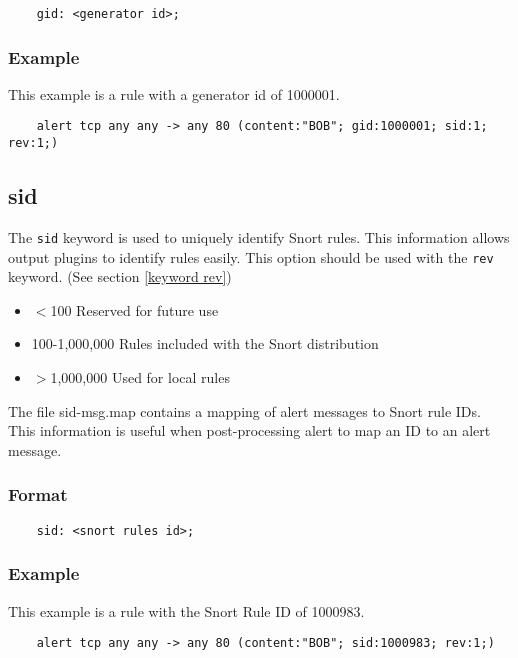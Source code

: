 \documentclass[english]{report}
\begin{document}
\begin{verbatim}
    gid: <generator id>;
\end{verbatim}

\subsubsection{Example}

This example is a rule with a generator id of 1000001. 

\begin{verbatim}
    alert tcp any any -> any 80 (content:"BOB"; gid:1000001; sid:1; rev:1;)
\end{verbatim}

\subsection{sid}
\label{keyword sid}

The \texttt{sid} keyword is used to uniquely identify Snort rules. This
information allows output plugins to identify rules easily.  This option should
be used with the \texttt{rev} keyword.  (See section \ref{keyword rev})

\begin{itemize}
\item $<$100 Reserved for future use
\item 100-1,000,000 Rules included with the Snort distribution
\item $>$1,000,000 Used for local rules
\end{itemize}

The file sid-msg.map contains a mapping of alert messages to Snort rule IDs.
This information is useful when post-processing alert to map an ID to an alert
message.  

\subsubsection{Format}

\begin{verbatim}
    sid: <snort rules id>;
\end{verbatim}

\subsubsection{Example}

This example is a rule with the Snort Rule ID of 1000983.

\begin{verbatim}
    alert tcp any any -> any 80 (content:"BOB"; sid:1000983; rev:1;)
\end{verbatim}
\end{document}
